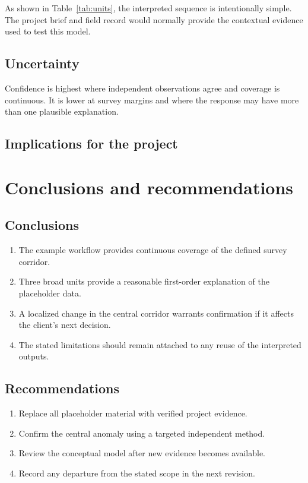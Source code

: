 \documentclass{erp-report}
\begin{document}
As shown in Table~\ref{tab:units}, the interpreted sequence is intentionally
simple. The project brief \cite{projectbrief} and field record
\cite{fieldrecord} would normally provide the contextual evidence used to
test this model.

\section{Uncertainty}
\lipsum[16]

\begin{summarybox}
  Confidence is highest where independent observations agree and coverage is
  continuous. It is lower at survey margins and where the response may have
  more than one plausible explanation.
\end{summarybox}

\section{Implications for the project}
\lipsum[17]

\chapter{Conclusions and recommendations}

\section{Conclusions}
\begin{enumerate}
  \item The example workflow provides continuous coverage of the defined
    survey corridor.
  \item Three broad units provide a reasonable first-order explanation of
    the placeholder data.
  \item A localized change in the central corridor warrants confirmation if
    it affects the client's next decision.
  \item The stated limitations should remain attached to any reuse of the
    interpreted outputs.
\end{enumerate}

\section{Recommendations}
\begin{recommendations}
  \begin{enumerate}
    \item Replace all placeholder material with verified project evidence.
    \item Confirm the central anomaly using a targeted independent method.
    \item Review the conceptual model after new evidence becomes available.
    \item Record any departure from the stated scope in the next revision.
  \end{enumerate}
\end{recommendations}
\end{document}
